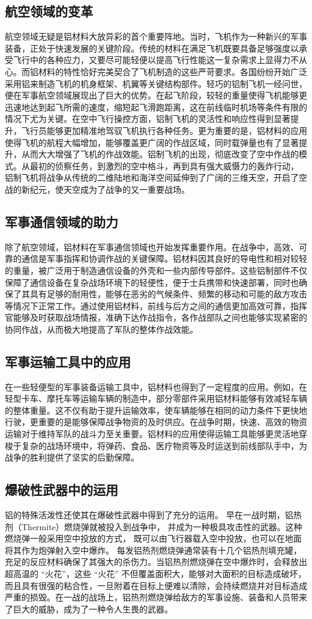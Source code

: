 \documentclass{source/Paper}
\begin{document}
\subsection{航空领域的变革}
航空领域无疑是铝材料大放异彩的首个重要阵地。当时，飞机作为一种新兴的军事装备，正处于快速发展的关键阶段。传统的材料在满足飞机既要具备足够强度以承受飞行中的各种应力，又要尽可能轻便以提高飞行性能这一复杂需求上显得力不从心。而铝材料的特性恰好完美契合了飞机制造的这些严苛要求。各国纷纷开始广泛采用铝来制造飞机的机身框架、机翼等关键结构部件。轻巧的铝制飞机一经问世，便在军事航空领域展现出了巨大的优势。在起飞阶段，较轻的重量使得飞机能够更迅速地达到起飞所需的速度，缩短起飞滑跑距离，这在前线临时机场等条件有限的情况下尤为关键。在空中飞行操控方面，铝制飞机的灵活性和响应性得到显著提升，飞行员能够更加精准地驾驭飞机执行各种任务。更为重要的是，铝材料的应用使得飞机的航程大幅增加，能够覆盖更广阔的作战区域，同时载弹量也有了显著提升，从而大大增强了飞机的作战效能。铝制飞机的出现，彻底改变了空中作战的模式。从最初的侦察任务，到激烈的空中格斗，再到具有强大威慑力的轰炸行动，
铝制飞机将战争从传统的二维陆地和海洋空间延伸到了广阔的三维天空，开启了空战的新纪元，使天空成为了战争的又一重要战场。
\subsection{军事通信领域的助力}
除了航空领域，铝材料在军事通信领域也开始发挥重要作用。在战争中，高效、可靠的通信是军事指挥和协调作战的关键保障。铝材料因其良好的导电性和相对较轻的重量，被广泛用于制造通信设备的外壳和一些内部传导部件。这些铝制部件不仅保障了通信设备在复杂战场环境下的轻便性，便于士兵携带和快速部署，同时也确保了其具有足够的耐用性，能够在恶劣的气候条件、频繁的移动和可能的敌方攻击等情况下正常工作。通过使用铝材料，前线与后方之间的通信更加高效可靠，指挥官能够及时获取战场情报，准确下达作战指令，各作战部队之间也能够实现紧密的协同作战，从而极大地提高了军队的整体作战效能。
\subsection{军事运输工具中的应用}
在一些轻便型的军事装备运输工具中，铝材料也得到了一定程度的应用。例如，在轻型卡车、摩托车等运输车辆的制造中，部分零部件采用铝材料能够有效减轻车辆的整体重量。这不仅有助于提升运输效率，使车辆能够在相同的动力条件下更快地行驶，更重要的是能够保障战争物资的及时供应。在战争时期，快速、高效的物资运输对于维持军队的战斗力至关重要。铝材料的应用使得运输工具能够更灵活地穿梭于复杂的战场环境中，将弹药、食品、医疗物资等及时运送到前线部队手中，为战争的胜利提供了坚实的后勤保障。
\subsection{爆破性武器中的运用}
铝的特殊活泼性还使其在爆破性武器中得到了充分的运用。
早在一战时期，铝热剂（Thermite）燃烧弹就被投入到战争中，
并成为一种极具攻击性的武器。这种燃烧弹一般采用空中投放的方式，
既可以由飞行器载入空中投放，也可以在地面将其作为炮弹射入空中爆炸。
每发铝热剂燃烧弹通常装有十几个铝热剂填充罐，充足的反应材料确保了其强大的杀伤力。当铝热剂燃烧弹在空中爆炸时，会释放出超高温的 “火花”，这些 “火花” 不但覆盖面积大，能够对大面积的目标造成破坏，而且具有很强的粘合性，一旦附着在目标上便难以清除，会持续燃烧并对目标造成严重的损毁。\cite{__2023}在一战的战场上，铝热剂燃烧弹给敌方的军事设施、装备和人员带来了巨大的威胁，成为了一种令人生畏的武器。
\end{document}
